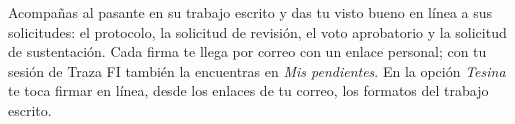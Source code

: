 \documentclass[11pt,a4paper]{article}
\begin{document}
{\small\tableofcontents}
\newpage
\begin{quevasahacer}
Acompañas al pasante en su trabajo escrito y das tu visto bueno en línea a sus solicitudes: el protocolo, la solicitud de revisión, el voto aprobatorio y la solicitud de sustentación. Cada firma te llega por correo con un enlace personal; con tu sesión de Traza FI también la encuentras en \emph{Mis pendientes}. En la opción \emph{Tesina} te toca firmar en línea, desde los enlaces de tu correo, los formatos del trabajo escrito.
\end{quevasahacer}



\end{document}
